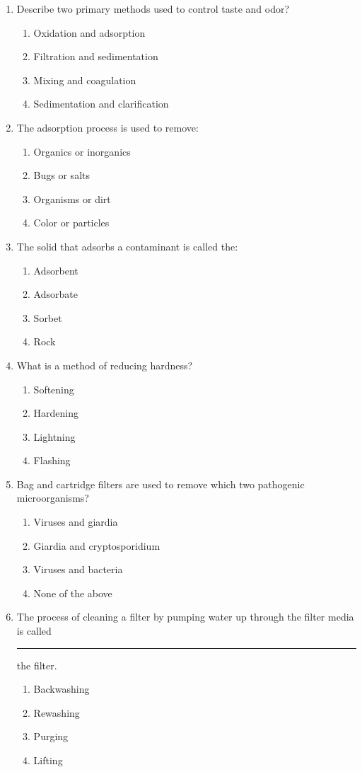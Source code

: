 \begin{enumerate}
\item Describe two primary methods used to control taste and odor?
\begin{enumerate}
\item Oxidation and adsorption
\item Filtration and sedimentation
\item Mixing and coagulation
\item Sedimentation and clarification
\end{enumerate}

\item The adsorption process is used to remove:
\begin{enumerate}
\item Organics or inorganics
\item Bugs or salts
\item Organisms or dirt
\item Color or particles
\end{enumerate}

\item The solid that adsorbs a contaminant is called the:
\begin{enumerate}
\item Adsorbent
\item Adsorbate
\item Sorbet
\item Rock
\end{enumerate}

\item What is a method of reducing hardness?
\begin{enumerate}
\item Softening
\item Hardening
\item Lightning
\item Flashing
\end{enumerate}


\item Bag and cartridge filters are used to remove which two pathogenic microorganisms?
\begin{enumerate}
\item Viruses and giardia
\item Giardia and cryptosporidium
\item Viruses and bacteria
\item None of the above
\end{enumerate}

\item The process of cleaning a filter by pumping water up through the filter media is called \rule{2cm}{0.3pt} the filter.
\begin{enumerate}
\item Backwashing
\item Rewashing
\item Purging
\item Lifting
\end{enumerate}


\end{enumerate}
